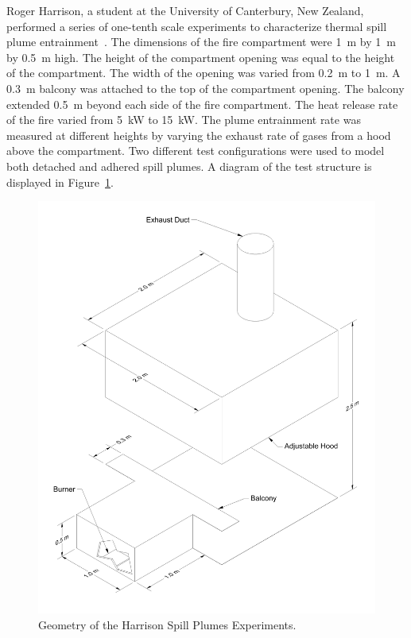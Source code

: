 Roger Harrison, a student at the University of Canterbury, New Zealand, performed a series of one-tenth scale experiments to characterize thermal spill plume entrainment~\cite{Harrison:2009,Harrison:IAFSS2008,Harrison:FT2007,Harrison:FSJ2010}. The dimensions of the fire compartment were 1~m by 1~m by 0.5~m high.  The height of the compartment opening was equal to the height of the compartment. The width of the opening was varied from 0.2~m to 1~m.  A 0.3~m balcony was attached to the top of the compartment opening. The balcony extended 0.5~m beyond each side of the fire compartment.  The heat release rate of the fire varied from 5~kW to 15~kW.
The plume entrainment rate was measured at different heights by varying the exhaust rate of gases from a hood above the compartment.
Two different test configurations were used to model both detached and adhered spill plumes. A diagram of the test structure is displayed in Figure~\ref{Harrison_Drawing}.

\begin{figure}[p]
\includegraphics[width=\textwidth]{FIGURES/Harrison_Spill_Plumes/Harrison_Spill_Plumes_Drawing}
\caption{Geometry of the Harrison Spill Plumes Experiments.}
\label{Harrison_Drawing}
\end{figure}




